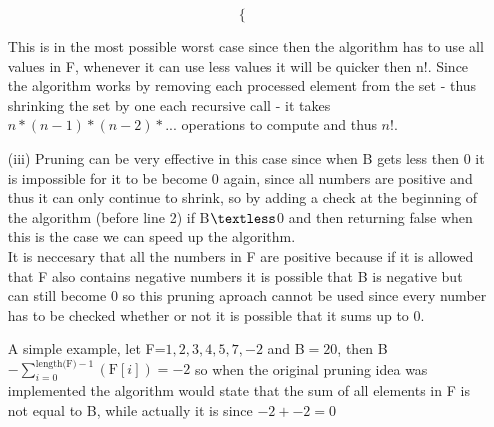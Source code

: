 \documentclass{article}
\newcounter{rcounter}
\newenvironment{rlist}%
{\begin{list}{A.1-\arabic{rcounter}}{\usecounter{rcounter}}}{\end{list}}
\newcounter{rcountermem}
\begin{document}
\begin{rlist}
\begin{enumerate}
\[\begin{cases}
\end{cases}
\]

This is in the most possible worst case since then the algorithm has to use all values in F, whenever it can use less values it will be quicker then n!. Since the algorithm works by removing each processed element from the set - thus shrinking the set by one each recursive call - it takes $n*(n-1)*(n-2)*$... operations to compute and thus $n!$.
      \item[(iii)] 
Pruning can be very effective in this case since when B gets less then 0 it is impossible for it to be become 0 again, since all numbers are positive and thus it can only continue to shrink, so by adding a check at the beginning of the algorithm (before line 2) if B$\textless$0 and then returning false when this is the case we can speed up the algorithm.\\

It is neccesary that all the numbers in F are positive because if it is allowed that F also contains negative numbers it is possible that B is negative but can still become 0 so this pruning aproach cannot be used since every number has to be checked whether or not it is possible that it sums up to 0.

A simple example, let F=${1,2,3,4,5,7,-2}$ and B$=20$, then B$-\sum_{i=0}^{\text{length(F)}-1}(\text{F}[i])=-2$ so when the original pruning idea was implemented the algorithm would state that the sum of all elements in F is not equal to B, while actually it is since $-2+-2=0$

      \end{enumerate}
      \setcounter{rcountermem}{\value{rcounter}}
\end{rlist}
\end{document}
